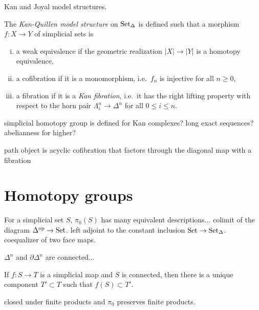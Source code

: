 \documentclass{../../large}
\begin{document}
\begin{prb}
\end{prb}

\begin{prb}
\end{prb}

\begin{prb}
Kan and Joyal model structures.

The \emph{Kan-Quillen model structure} on $\operatorname{Set}_\Delta$ is defined such that a morphism $f:X\to Y$ of simplicial sets is
\begin{enumerate}[(i)]
\item a weak equivalence if the geometric realization $|X|\to|Y|$ is a homotopy equivalence,
\item a cofibration if it is a monomorphism, i.e.~$f_n$ is injective for all $n\ge0$,
\item a fibration if it is a \emph{Kan fibration}, i.e.~it has the right lifting property with respect to the horn pair $\Lambda_i^n\to\Delta^n$ for all $0\le i\le n$.
\end{enumerate}

\end{prb}




\begin{prb}
\end{prb}



simplicial homotopy group is defined for Kan complexes?
long exact sequences?
abelianness for higher?

path object is acyclic cofibration that factors through the diagonal map with a fibration



\section{Homotopy groups}
\begin{prb}
For a simplicial set $S$, $\pi_0(S)$ has many equivalent descriptions...
colimit of the diagram $\Delta^{\mathrm{op}}\to\operatorname{Set}$.
left adjoint to the constant inclusion $\operatorname{Set}\to\operatorname{Set}_\Delta$.
coequalizer of two face maps.

$\Delta^n$ and $\partial\Delta^n$ are connected...
\begin{parts}
\item If $f:S\to T$ is a simplicial map and $S$ is connected, then there is a unique component $T'\subset T$ such that $f(S)\subset T'$.
\item closed under finite products and $\pi_0$ preserves finite products.
\end{parts}
\end{prb}
\end{document}
